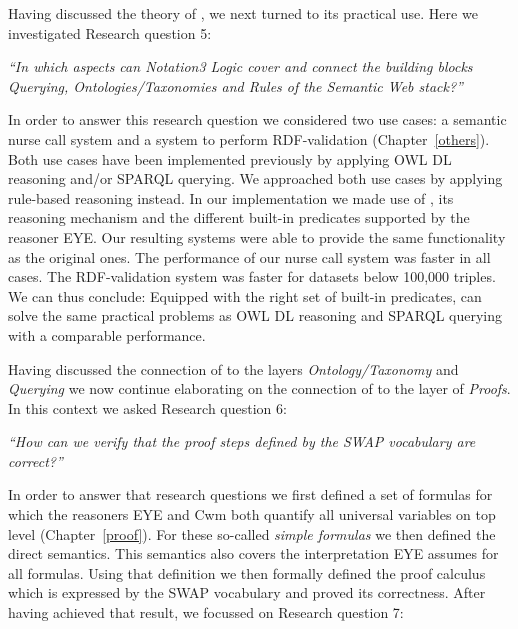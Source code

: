 Having discussed the theory of \nthree, we next turned to its practical use. Here we investigated Research question 5:

\emph{ 
``In which aspects can Notation3 Logic cover and connect the building blocks \emph{Querying}, \emph{Ontologies/Taxonomies} and \emph{Rules} 
of the Semantic Web stack?''
}

In order to answer this research question we considered two use cases: a semantic nurse call 
system and a system to perform RDF-validation (Chapter~\ref{others}). Both use cases have been implemented previously by applying OWL DL reasoning and/or SPARQL querying.
We approached both use cases by applying rule-based reasoning instead. In our implementation we made use of \nthree, its reasoning mechanism and the different built-in 
predicates supported by the reasoner EYE. 
Our resulting systems were able to provide the same functionality as the original ones.
The performance of our nurse call system was faster in all cases.  
The RDF-validation system was faster for datasets below 100,000 triples. 
We can thus conclude: Equipped with the right set of built-in predicates, \nthree can solve the same practical problems as OWL DL reasoning and SPARQL querying with a comparable performance.

Having discussed the connection of \nthreelogic to the layers \emph{Ontology/Taxonomy} and \emph{Querying} we now continue elaborating on the connection
of \nthree to the layer of \emph{Proofs}. In this context we asked Research question 6:

\emph{``How can we verify that the proof steps defined by the SWAP vocabulary are correct?''}

In order to answer that research questions we first defined a set of formulas for which the reasoners EYE and Cwm both quantify all universal variables on top level (Chapter~\ref{proof}).
For these so-called \emph{simple formulas} we then defined the direct semantics. This semantics also covers the interpretation EYE assumes for all formulas.
Using that definition we then formally defined the proof calculus which is expressed by the SWAP vocabulary and proved its correctness.
After having achieved that result, we focussed on Research question 7:


